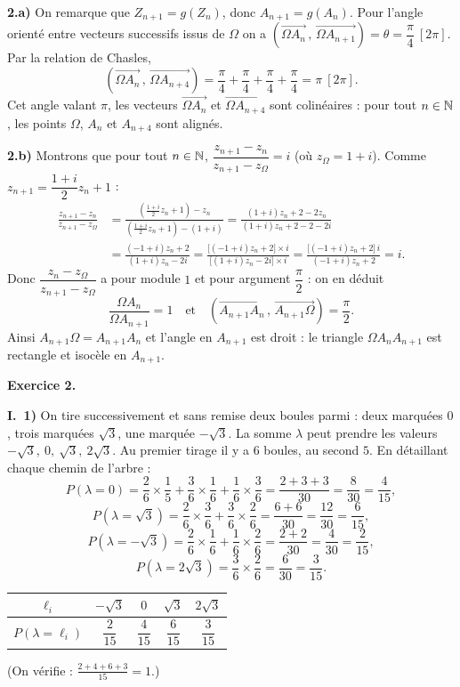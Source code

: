 \noindent\textbf{2.a)} On remarque que $Z_{n+1}=g(Z_n)$, donc $A_{n+1}=g(A_n)$. Pour l'angle orienté entre vecteurs successifs issus de $\Omega$ on a $\left(\overrightarrow{\Omega A_n}\,,\,\overrightarrow{\Omega A_{n+1}}\right)=\theta=\dfrac{\pi}{4}\ [2\pi]$. Par la relation de Chasles,
\[
\left(\overrightarrow{\Omega A_n}\,,\,\overrightarrow{\Omega A_{n+4}}\right)=\frac{\pi}{4}+\frac{\pi}{4}+\frac{\pi}{4}+\frac{\pi}{4}=\pi\ [2\pi].
\]
Cet angle valant $\pi$, les vecteurs $\overrightarrow{\Omega A_n}$ et $\overrightarrow{\Omega A_{n+4}}$ sont colinéaires : pour tout $n\in\mathbb{N}$, les points $\Omega$, $A_n$ et $A_{n+4}$ sont alignés.

\noindent\textbf{2.b)} Montrons que pour tout $n\in\mathbb{N}$, $\dfrac{z_{n+1}-z_n}{z_{n+1}-z_\Omega}=i$ (où $z_\Omega=1+i$). Comme $z_{n+1}=\dfrac{1+i}{2}z_n+1$ :
\begin{align*}
\frac{z_{n+1}-z_n}{z_{n+1}-z_\Omega}
&=\frac{\left(\frac{1+i}{2}z_n+1\right)-z_n}{\left(\frac{1+i}{2}z_n+1\right)-(1+i)}
=\frac{(1+i)z_n+2-2z_n}{(1+i)z_n+2-2-2i}\\
&=\frac{(-1+i)z_n+2}{(1+i)z_n-2i}
=\frac{\big[(-1+i)z_n+2\big]\times i}{\big[(1+i)z_n-2i\big]\times i}
=\frac{\big[(-1+i)z_n+2\big]\,i}{(-1+i)z_n+2}=i .
\end{align*}
Donc $\dfrac{z_n-z_\Omega}{z_{n+1}-z_\Omega}$ a pour module $1$ et pour argument $\dfrac{\pi}{2}$ : on en déduit
\[
\frac{\Omega A_n}{\Omega A_{n+1}}=1\quad\text{et}\quad \left(\overrightarrow{A_{n+1}A_n}\,,\,\overrightarrow{A_{n+1}\Omega}\right)=\frac{\pi}{2}.
\]
Ainsi $A_{n+1}\Omega=A_{n+1}A_n$ et l'angle en $A_{n+1}$ est droit : le triangle $\Omega A_n A_{n+1}$ est rectangle et isocèle en $A_{n+1}$.

\bigskip
\noindent\textbf{Exercice 2.}

\smallskip
\noindent\textbf{I.\ 1)} On tire successivement et sans remise deux boules parmi : deux marquées $0$, trois marquées $\sqrt3$, une marquée $-\sqrt3$. La somme $\lambda$ peut prendre les valeurs $-\sqrt3,\ 0,\ \sqrt3,\ 2\sqrt3$. Au premier tirage il y a $6$ boules, au second $5$. En détaillant chaque chemin de l'arbre :
\[
P(\lambda=0)=\frac26\times\frac15+\frac36\times\frac16+\frac16\times\frac36=\frac{2+3+3}{30}=\frac{8}{30}=\frac{4}{15},
\]
\[
P(\lambda=\sqrt3)=\frac26\times\frac36+\frac36\times\frac26=\frac{6+6}{30}=\frac{12}{30}=\frac{6}{15},
\]
\[
P(\lambda=-\sqrt3)=\frac26\times\frac16+\frac16\times\frac26=\frac{2+2}{30}=\frac{4}{30}=\frac{2}{15},
\]
\[
P(\lambda=2\sqrt3)=\frac36\times\frac26=\frac{6}{30}=\frac{3}{15}.
\]
\begin{center}
\begin{tabular}{c|cccc}
$\ell_i$ & $-\sqrt3$ & $0$ & $\sqrt3$ & $2\sqrt3$\\\hline
$P(\lambda=\ell_i)$ & $\dfrac{2}{15}$ & $\dfrac{4}{15}$ & $\dfrac{6}{15}$ & $\dfrac{3}{15}$\\
\end{tabular}
\end{center}
(On vérifie : $\frac{2+4+6+3}{15}=1$.)

